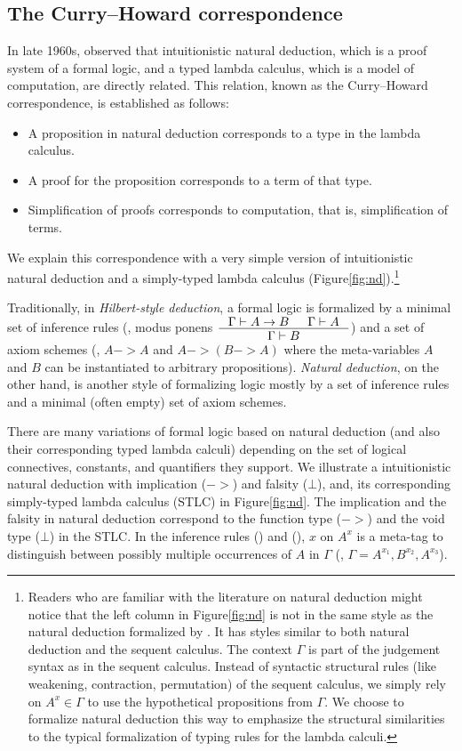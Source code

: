 \subsection{The Curry--Howard correspondence}
In late 1960s, \citet{Howard69} observed that intuitionistic natural deduction,
which is a proof system of a formal logic, and a typed lambda calculus,
which is a model of computation, are directly related. This relation,
known as the Curry--Howard correspondence, is established as follows:
\begin{itemize}
\item A proposition in natural deduction corresponds to
        a type in the lambda calculus.
\item A proof for the proposition corresponds to
        a term of that type.
\item Simplification of proofs corresponds to computation,
        that is, simplification of terms.
\end{itemize}
We explain this correspondence with a very simple
version of intuitionistic natural deduction and
a simply-typed lambda calculus (Figure\;\ref{fig:nd}).\footnote{
        Readers who are familiar with the literature on natural deduction
        might notice that the left column in Figure\;\ref{fig:nd} is not in
        the same style as the natural deduction formalized by
        \citet{Gentzen35,Gentzen69}. It has styles similar to
        both natural deduction and the sequent calculus. The context $\Gamma$
        is part of the judgement syntax as in the sequent calculus. Instead
        of syntactic structural rules (like weakening,
        contraction, permutation) of the sequent calculus, we simply rely on
        $A^x \in \Gamma$ to use the hypothetical propositions from $\Gamma$.
        We choose to formalize natural deduction this way to emphasize
        the structural similarities to the typical formalization
        of typing rules for the lambda calculi.}

Traditionally, in \emph{Hilbert-style deduction}, a formal logic is formalized
by a minimal set of inference rules (\eg, modus ponens
$\inference{\Gamma |- A -> B & \Gamma |- A}{\Gamma |- B}$)
and a set of axiom schemes (\eg, $A -> A$ and $A -> (B -> A)$ where
the meta-variables $A$ and $B$ can be instantiated to arbitrary propositions).
\emph{Natural deduction}, on the other hand, is another style of
formalizing logic mostly by a set of inference rules and a minimal
(often empty) set of axiom schemes.

There are many variations of formal logic based on natural deduction
(and also their corresponding typed lambda calculi) depending on
the set of logical connectives, constants, and quantifiers they support.
We illustrate a intuitionistic natural deduction with implication ($->$) and
falsity ($\bot$), and, its corresponding simply-typed lambda calculus (STLC)
in Figure\;\ref{fig:nd}. The implication and the falsity in natural deduction
correspond to the function type ($->$) and the void type ($\bot$) in the STLC.
In the inference rules () and (),
$x$ on $A^x$ is a meta-tag to distinguish between possibly multiple
occurrences of $A$ in $\Gamma$ (\eg, $\Gamma = A^{x_1},B^{x_2},A^{x_3}$).

